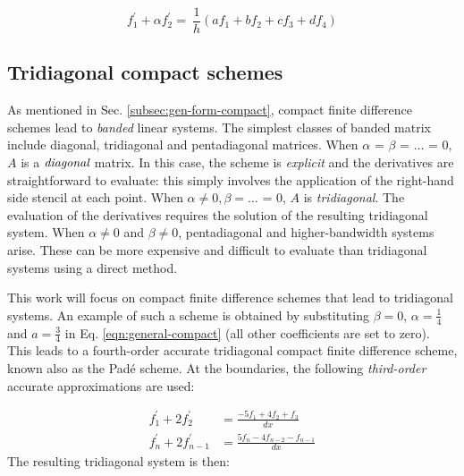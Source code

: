 \begin{equation}
    f_1^{\prime} + \alpha f_2^{\prime} = \
        \frac{1}{h}(af_1 + bf_2 + cf_3 + df_4)
\label{eqn:boundary-compact}
\end{equation}

\subsection{Tridiagonal compact schemes}
\label{sec:tridiagonal-compact-schemes}

As mentioned in Sec. \ref{subsec:gen-form-compact},
compact finite difference schemes lead to
\emph{banded} linear systems.
The simplest classes of banded matrix include
diagonal, tridiagonal and pentadiagonal matrices.
When $\alpha$ = $\beta$ = $\hdots$ = 0,
$A$ is a $\emph{diagonal}$ matrix.
In this case, the
scheme is \emph{explicit}
and the derivatives are straightforward to evaluate:
this simply involves the
application of the right-hand side stencil at each point.
When $\alpha \neq 0, \beta = \hdots$ = 0,
$A$ is \emph{tridiagonal}.
The evaluation of the derivatives requires
the solution of the resulting tridiagonal system.
When $\alpha \neq 0$ and $\beta \neq  0$,
pentadiagonal and higher-bandwidth systems arise.
These can be more expensive and difficult to evaluate
than tridiagonal systems
using a direct method.

This work will focus on
compact finite difference schemes that lead
to tridiagonal systems.
An example of such a scheme is obtained
by substituting 
$\beta = 0$, $\alpha = \frac{1}{4}$ and $a = \frac{3}{4}$
in Eq. \ref{eqn:general-compact}
(all other coefficients are set to zero).
This leads to a fourth-order accurate
tridiagonal compact finite difference scheme,
known also as the Pad\'{e} scheme.
At the boundaries,
the following \emph{third-order} accurate
approximations are used:

\begin{align}
    f^{\prime}_1 + 2f^{\prime}_2 &= \frac{-5f_1 + 4f_2 + f_3}{dx} \\
    f^{\prime}_{n} + 2f^{\prime}_{n-1}
    &=
    \frac{5f_{n} - 4f_{n-2} -  f_{n-1}}{dx}
\end{align}
%
The resulting tridiagonal system is then:

